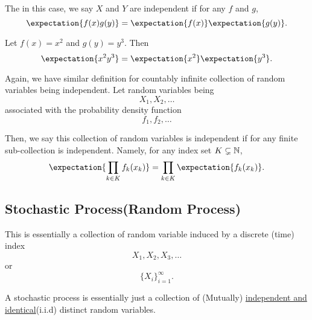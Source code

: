 The in this case, we say \(X\) and \(Y\) are independent if for any \(f\) and \(g\),
\[
	\expectation{f(x)g(y)} = \expectation{f(x)}\expectation{g(y)}.
\]
\begin{eg}
	Let \(f(x) = x^2\) and \(g(y) = y^3\). Then
	\[
		\expectation{x^2 y^3} = \expectation{x^2} \expectation{y^3}.
	\]
\end{eg}

Again, we have similar definition for countably infinite collection of random variables being independent. Let random variables being
\[
	X_1, X_2, \ldots
\]
associated with the probability density function
\[
	f_1, f_2, \ldots
\]

Then, we say this collection of random variables is independent if for any finite sub-collection is independent. Namely, for any index set \(K\subsetneq\mathbb{\MakeUppercase{N}}\),
\[
	\expectation{\prod\limits_{k\in K} f_k(x_k)} = \prod\limits_{k\in K} \expectation{f_k(x_k)}.
\]


\subsection{Stochastic Process(Random Process)}
This is essentially a collection of random variable induced by a discrete (time) index
\[
	X_1, X_2, X_3, \ldots
\]
or
\[
	\{X_i\}_{i = 1}^{\infty }.
\]

\begin{intuition}
	A stochastic process is essentially just a collection of (Mutually) \underline{independent and identical}(i.i.d) distinct random variables.
\end{intuition}

